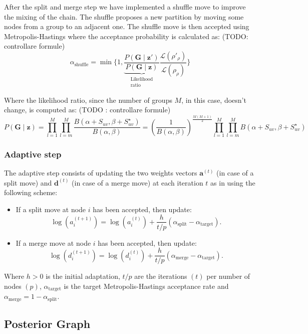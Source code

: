 After the split and merge step we have implemented a shuffle move to improve the mixing of the chain. The shuffle proposes a new partition by moving some nodes from a group to an adjacent one.
The shuffle move is then accepted using Metropolis-Hastings where the acceptance probability is calculated as: (TODO: controllare formule)
 \[
   \alpha_{\text{shuffle}} = \min
   \bigg\{1,
   \underbrace{\frac{P(\bm{G}\mid \bm{z}')}{P(\bm{G}\mid \bm{z})}}_{\substack{\text{Likelihood}\\\text{ratio}}}
   {\frac{\mathcal{L}(\rho'_{\rho})}{\mathcal{L}(\rho_{\rho})}}
   \bigg\}
\]

Where the likelihood ratio, since  the number of groups $M$, in this case, doesn't change, is computed as: (TODO : controllare formule)
 \[
   P(\bm{G}\mid \bm{z}) = \prod_{l=1}^M \prod_{l=m}^M \frac{B(\alpha+S_{uv},\beta+S^{\star}_{uv})}{B(\alpha,\beta)} = \left(\frac{1}{B(\alpha,\beta)}\right)^\frac{M(M+1)}{2}\prod_{l=1}^M \prod_{l=m}^M B(\alpha+S_{uv},\beta+S^{\star}_{uv})
\]

\subsubsection{Adaptive step}

The adaptive step consists of updating the two weights vectors $\bm{a}^{(t)}$ (in case of a split move) and $\bm{d}^{(t)}$ (in case of a merge move) at each iteration $t$ as in \parencite{bensonAdaptiveMCMCMultiple2018} using the following scheme:
    \begin{itemize}
        \item If a split move at node $i$ has been accepted, then update:
		\[
		    \log (a_i^{(t+1)})=\log (a_i^{(t)})+\frac{h}{t/p}(\alpha_{\text{split}}-\alpha_{\text{target}}) .
		\]
        \item If a merge move at node $i$ has been accepted, then update:
		\[
		    \log (d_i^{(t+1)})=\log (d_i^{(t)})+\frac{h}{t/p}(\alpha_{\text{merge}}-\alpha_{\text{target}}) .
		\]
    \end{itemize}

Where $h>0$ is the initial adaptation, $t/p$ are the iterations $(t)$ per number of nodes $(p)$, $\alpha_{\text{target}}$ is the target Metropolis-Hastings acceptance rate and $\alpha_{\text{merge}} = 1 - \alpha_{\text{split}}$.

\subsection{Posterior Graph}

